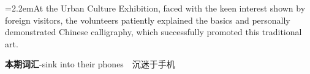 \documentclass[11pt,a4paper]{article}
\newcommand{\num}[1]{\makebox[1.9em][r]{#1.}\hspace{0.3em}}
\begin{document}
\vspace{0.15em}

\noindent\hangindent=2.2em\hspace{2.2em}At the Urban Culture Exhibition, faced with the keen interest shown by foreign visitors, the volunteers patiently explained the basics and personally demonstrated Chinese calligraphy, which successfully promoted this traditional art.

\vspace{0.4em}\noindent{\color{rulegray}\rule{\textwidth}{0.6pt}}\vspace{0.4em}

\num{5}\textbf{本期词汇}\quad -sink into their phones　沉迷于手机
\end{document}
